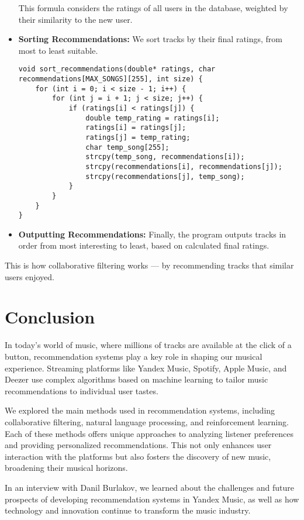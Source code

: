 \documentclass[12pt,a4paper]{article}
\begin{document}
\begin{itemize}
    This formula considers the ratings of all users in the database, weighted by their similarity to the new user.

    \item \textbf{Sorting Recommendations:} We sort tracks by their final ratings, from most to least suitable.
\begin{lstlisting}
void sort_recommendations(double* ratings, char recommendations[MAX_SONGS][255], int size) {
    for (int i = 0; i < size - 1; i++) {
        for (int j = i + 1; j < size; j++) {
            if (ratings[i] < ratings[j]) {
                double temp_rating = ratings[i];
                ratings[i] = ratings[j];
                ratings[j] = temp_rating;
                char temp_song[255];
                strcpy(temp_song, recommendations[i]);
                strcpy(recommendations[i], recommendations[j]);
                strcpy(recommendations[j], temp_song);
            }
        }
    }
}
\end{lstlisting}

    \item \textbf{Outputting Recommendations:} Finally, the program outputs tracks in order from most interesting to least, based on calculated final ratings.
\end{itemize}

This is how collaborative filtering works — by recommending tracks that similar users enjoyed.

\section{Conclusion}
In today’s world of music, where millions of tracks are available at the click of a button, recommendation systems play a key role in shaping our musical experience. Streaming platforms like Yandex Music, Spotify, Apple Music, and Deezer use complex algorithms based on machine learning to tailor music recommendations to individual user tastes.

We explored the main methods used in recommendation systems, including collaborative filtering, natural language processing, and reinforcement learning. Each of these methods offers unique approaches to analyzing listener preferences and providing personalized recommendations. This not only enhances user interaction with the platforms but also fosters the discovery of new music, broadening their musical horizons.

In an interview with Danil Burlakov, we learned about the challenges and future prospects of developing recommendation systems in Yandex Music, as well as how technology and innovation continue to transform the music industry.
\end{document}
